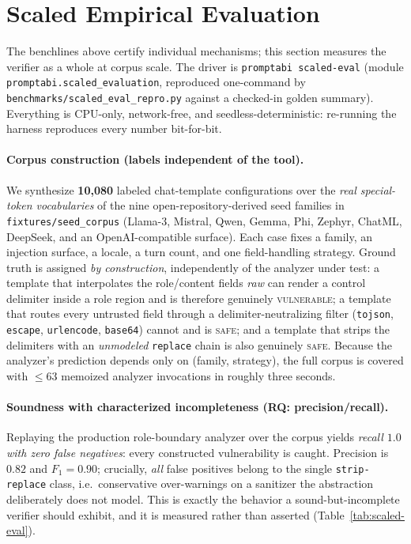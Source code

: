 \documentclass[10pt]{article}
\begin{document}
\newpage
\section{Scaled Empirical Evaluation}
\label{sec:scaled-eval}

The benchlines above certify individual mechanisms; this section measures the
verifier as a whole at corpus scale. The driver is
\texttt{promptabi scaled-eval} (module \texttt{promptabi.scaled\_evaluation},
reproduced one-command by \texttt{benchmarks/scaled\_eval\_repro.py} against a
checked-in golden summary). Everything is CPU-only, network-free, and
seedless-deterministic: re-running the harness reproduces every number
bit-for-bit.

\paragraph{Corpus construction (labels independent of the tool).}
We synthesize \textbf{10{,}080} labeled chat-template configurations over the
\emph{real special-token vocabularies} of the nine open-repository-derived seed
families in \texttt{fixtures/seed\_corpus} (Llama-3, Mistral, Qwen, Gemma, Phi,
Zephyr, ChatML, DeepSeek, and an OpenAI-compatible surface). Each case fixes a
family, an injection surface, a locale, a turn count, and one field-handling
strategy. Ground truth is assigned \emph{by construction}, independently of the
analyzer under test: a template that interpolates the role/content fields
\emph{raw} can render a control delimiter inside a role region and is therefore
genuinely \textsc{vulnerable}; a template that routes every untrusted field
through a delimiter-neutralizing filter (\texttt{tojson}, \texttt{escape},
\texttt{urlencode}, \texttt{base64}) cannot and is \textsc{safe}; and a template
that strips the delimiters with an \emph{unmodeled} \texttt{replace} chain is
also genuinely \textsc{safe}. Because the analyzer's prediction depends only on
(family, strategy), the full corpus is covered with $\leq 63$ memoized analyzer
invocations in roughly three seconds.

\paragraph{Soundness with characterized incompleteness (RQ: precision/recall).}
Replaying the production role-boundary analyzer over the corpus yields
\emph{recall $1.0$ with zero false negatives}: every constructed vulnerability is
caught. Precision is $0.82$ and $F_1 = 0.90$; crucially, \emph{all} false
positives belong to the single \texttt{strip-replace} class, i.e.\ conservative
over-warnings on a sanitizer the abstraction deliberately does not model. This is
exactly the behavior a sound-but-incomplete verifier should exhibit, and it is
measured rather than asserted (Table~\ref{tab:scaled-eval}).
\end{document}
